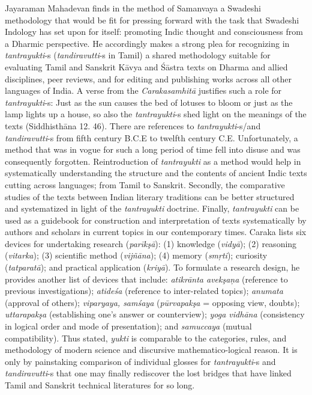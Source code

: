 Jayaraman Mahadevan finds in the method of Samanvaya a Swadeshi methodology that would be fit for pressing forward with the task that Swadeshi Indology has set upon for itself: promoting Indic thought and consciousness from a Dharmic perspective. He accordingly makes a strong plea for recognizing in \textit{tantrayukti}-s (\textit{tandiravutti}-s in Tamil) a shared methodology suitable for evaluating Tamil and Sanskrit Kāvya and Śāstra texts on Dharma and allied disciplines, peer reviews, and for editing and publishing works across all other languages of India. A verse from the \textit{Carakasamhitā} justifies such a role for \textit{tantrayukti}-s: Just as the sun causes the bed of lotuses to bloom or just as the lamp lights up a house, so also the \textit{tantrayukti}-s shed light on the meanings of the texts (Siddhisthāna 12. 46). There are references to \textit{tantrayukti}-s/and \textit{tandiravutti}-s from fifth century B.C.E to twelfth century C.E. Unfortunately, a method that was in vogue for such a long period of time fell into disuse and was consequently forgotten. Reintroduction of \textit{tantrayukti} as a method would help in systematically understanding the structure and the contents of ancient Indic texts cutting across languages; from Tamil to Sanskrit. Secondly, the comparative studies of the texts between Indian literary traditions can be better structured and systematized in light of the \textit{tantrayukti} doctrine. Finally, \textit{tantrayukti} can be used as a guidebook for construction and interpretation of texts systematically by authors and scholars in current topics in our contemporary times. Caraka lists six devices for undertaking research (\textit{parīkşā}): (1) knowledge (\textit{vidyā}); (2) reasoning (\textit{vitarka}); (3) scientific method (\textit{vijñāna}); (4) memory (\textit{smŗti}); curiosity (\textit{tatparatā}); and practical application (\textit{kriyā}). To formulate a research design, he provides another list of devices that include: \textit{atikrānta avekşaņa} (reference to previous investigations); \textit{atideśa} (reference to inter-related topics); \textit{anumata} (approval of others); \textit{viparyaya, samśaya} (\textit{pūrvapakşa} = opposing view, doubts); \textit{uttarapakşa} (establishing one’s answer or counterview); \textit{yoga vidhāna} (consistency in logical order and mode of presentation); and \textit{samuccaya} (mutual compatibility). Thus stated, \textit{yukti} is comparable to the categories, rules, and methodology of modern science and discursive mathematico-logical reason. It is only by painstaking comparison of individual glosses for \textit{tantrayukti}-s and \textit{tandiravutti}-s that one may finally rediscover the lost bridges that have linked Tamil and Sanskrit technical literatures for so long.

